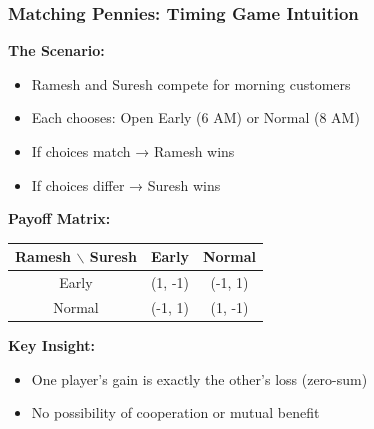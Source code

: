 \begin{frame}[fragile]\frametitle{Matching Pennies: Timing Game Intuition}

\textbf{The Scenario:}
\begin{itemize}
  \item Ramesh and Suresh compete for morning customers
  \item Each chooses: Open Early (6 AM) or Normal (8 AM)
  \item If choices match → Ramesh wins
  \item If choices differ → Suresh wins
\end{itemize}

\vspace{6pt}

\textbf{Payoff Matrix:}

\begin{center}
\begin{tabular}{|c|c|c|}
  \hline
  \textbf{Ramesh $\backslash$ Suresh} & Early & Normal \\
  \hline
  Early & (1, -1) & (-1, 1) \\
  \hline
  Normal & (-1, 1) & (1, -1) \\
  \hline
\end{tabular}
\end{center}

\vspace{6pt}

\textbf{Key Insight:}
\begin{itemize}
  \item One player's gain is exactly the other's loss (zero-sum)
  \item No possibility of cooperation or mutual benefit
\end{itemize}

\end{frame}

